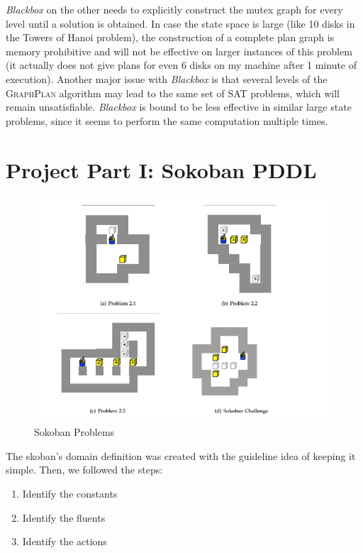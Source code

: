 \documentclass[10pt, letter]{article}
\begin{document}
\textit{Blackbox} on the other needs to explicitly construct the mutex graph for every level until a solution is obtained. In case the state space is large (like 10 disks in the Towers of Hanoi problem), the construction of a complete plan graph is memory prohibitive and will not be effective on larger instances of this problem (it actually does not give plans for even 6 disks on my machine after 1 minute of execution). Another major issue with \textit{Blackbox} is that several levels of the \textsc{GraphPlan} algorithm may lead to the same set of SAT problems, which will remain unsatisfiable. \textit{Blackbox} is bound to be less effective in similar large state problems, since it seems to perform the same computation multiple times.


\section{Project Part I: Sokoban PDDL}

\begin{figure}[h]
  \centering
    \includegraphics[scale = 0.3]{images/sokoban}
    \caption{Sokoban Problems}
  \label{fig2}
\end{figure}

The skoban's domain definition was created with the guideline idea of keeping it simple. Then, we followed the steps:

\begin{enumerate}
\item Identify the constants
\item Identify the fluents
\item Identify the actions
\end{enumerate} 
\end{document}
